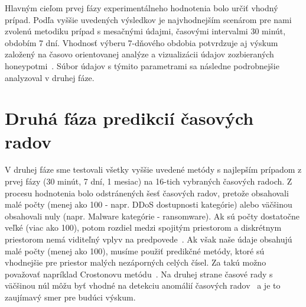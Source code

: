 \documentclass[thesismargins, thesislinespacing, openright, upjsfrontpage, combineabstracts]{rnthesis}
\begin{document}
Hlavným cieľom prvej fázy experimentálneho hodnotenia bolo určiť vhodný prípad. Podľa vyššie uvedených výsledkov je najvhodnejším scenárom pre nami zvolenú metodiku prípad s mesačnými údajmi, časovými intervalmi 30 minút, obdobím 7 dní. Vhodnosť výberu 7-dňového obdobia potvrdzuje aj výskum založený na časovo orientovanej analýze a vizualizácii údajov zozbieraných honeypotmi~\cite{sokol2015study}. Súbor údajov s týmito parametrami sa následne podrobnejšie analyzoval v druhej fáze.

\section{Druhá fáza predikcií časových radov}

V druhej fáze sme testovali všetky vyššie uvedené metódy s najlepším prípadom z prvej fázy (30 minút, 7 dní, 1 mesiac) na 16-tich vybraných časových radoch. Z procesu hodnotenia bolo odstránených šesť časových radov, pretože obsahovali malé počty (menej ako 100 - napr. DDoS dostupnosti kategórie) alebo väčšinou obsahovali nuly (napr. Malware kategórie - ransomware). Ak sú počty dostatočne veľké (viac ako 100), potom rozdiel medzi spojitým priestorom a diskrétnym priestorom nemá viditeľný vplyv na predpovede~\cite{hyndman2018forecasting}. Ak však naše údaje obsahujú malé počty (menej ako 100), musíme použiť predikčné metódy, ktoré sú vhodnejšie pre priestor malých nezáporných celých čísel. Za takú možno považovať napríklad Crostonovu metódu~\cite{Croston1972ForecastingAS, Christou2015}. Na druhej strane časové rady s väčšinou núl môžu byť vhodné na detekciu anomálií časových radov~\cite{mehrotra2017anomaly} a je to zaujímavý smer pre budúci výskum.
\end{document}
